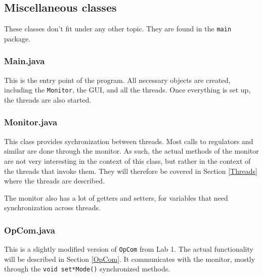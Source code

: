 


\subsection{Miscellaneous classes} 	%
These classes don't fit under any other topic. They are found in the \texttt{main} package.

\subsubsection{Main.java}
This is the entry point of the program. 
All necessary objects are created, including the \texttt{Monitor}, the GUI, and all the threads.  
Once everything is set up, the threads are also started. 

\subsubsection{Monitor.java}
This class provides sychronization between threads. Most calls to regulators and similar are done through the monitor. 
As such, the actual methods of the monitor are not very interesting in the context of this class, but rather in the context of the threads that invoke them. 
They will therefore be covered in Section \ref{Threads} where the threads are described.

The monitor also has a lot of getters and setters, for variables that need synchronization across threads.

\subsubsection{OpCom.java}
This is a slightly modified version of \texttt{OpCom} from Lab 1. 
The actual functionality will be described in Section \ref{OpCom}. 
It communicates with the monitor, mostly through the \texttt{void set*Mode()} synchronized methods.



